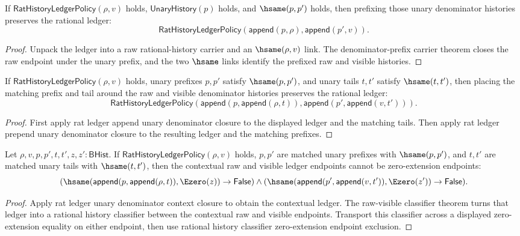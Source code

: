 \begin{theorem}
\label{thm:rat-ledger-prepend-unary-denominator-closed}
If $\mathsf{RatHistoryLedgerPolicy}(\rho,v)$ holds,
$\mathsf{UnaryHistory}(p)$ holds, and $\hsame(p,p')$ holds, then prefixing
those unary denominator histories preserves the rational ledger:
$$
\mathsf{RatHistoryLedgerPolicy}(\mathsf{append}(p,\rho),\mathsf{append}(p',v)).
$$
\end{theorem}
\begin{proof}
Unpack the ledger into a raw rational-history carrier and an $\hsame(\rho,v)$
link. The denominator-prefix carrier theorem closes the raw endpoint under the
unary prefix, and the two $\hsame$ links identify the prefixed raw and visible
histories.
\end{proof}

\begin{theorem}
\label{thm:rat-ledger-unary-denominator-context-closed}
If $\mathsf{RatHistoryLedgerPolicy}(\rho,v)$ holds, unary prefixes $p,p'$
satisfy $\hsame(p,p')$, and unary tails $t,t'$ satisfy $\hsame(t,t')$, then
placing the matching prefix and tail around the raw and visible denominator
histories preserves the rational ledger:
$$
\mathsf{RatHistoryLedgerPolicy}(\mathsf{append}(p,\mathsf{append}(\rho,t)),
\mathsf{append}(p',\mathsf{append}(v,t'))).
$$
\end{theorem}
\begin{proof}
First apply rat ledger append unary denominator closure to the displayed ledger
and the matching tails. Then apply rat ledger prepend unary denominator closure
to the resulting ledger and the matching prefixes.
\end{proof}

\begin{theorem}
\label{thm:rat-ledger-unary-context-zero-extension-endpoint-exclusion}
Let $\rho,v,p,p',t,t',z,z':\mathsf{BHist}$. If
$\mathsf{RatHistoryLedgerPolicy}(\rho,v)$ holds, $p,p'$ are matched unary
prefixes with $\hsame(p,p')$, and $t,t'$ are matched unary tails with
$\hsame(t,t')$, then the contextual raw and visible ledger endpoints cannot be
zero-extension endpoints:
$$
(\hsame(\mathsf{append}(p,\mathsf{append}(\rho,t)),\Ezero(z))\to
\mathsf{False})\land
(\hsame(\mathsf{append}(p',\mathsf{append}(v,t')),\Ezero(z'))\to
\mathsf{False}).
$$
\end{theorem}
\begin{proof}
Apply rat ledger unary denominator context closure to obtain the contextual
ledger. The raw-visible classifier theorem turns that ledger into a rational
history classifier between the contextual raw and visible endpoints. Transport
this classifier across a displayed zero-extension equality on either endpoint,
then use rational history classifier zero-extension endpoint exclusion.
\end{proof}

